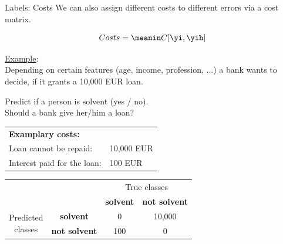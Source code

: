 \documentclass[11pt,compress,t,notes=noshow, xcolor=table]{beamer}
\begin{document}
\begin{vbframe}{Labels: Costs}
We can also assign different costs to different errors via a cost matrix.

$$
  Costs = \meanin C[\yi, \yih]
$$

\underline{Example}: \\

Depending on certain features (age, income, profession, ...) a bank wants to decide, if it grants a 10,000 EUR loan.\\ 

\medskip

Predict if a person is solvent (yes / no).\\ 
Should a bank give her/him a loan?\\


\medskip
  \begin{tabular}{ll}
    \textbf{Examplary costs:} & \\
    Loan cannot be repaid:& 10,000 EUR\\
    Interest paid for the loan:& 100 EUR\\
 
  \end{tabular}
  


 \begin{table}[ht]
 \small

\begin{tabular}{cccc}
    \hline
    & &\multicolumn{2}{c}{True classes} \\ 
    & &\textbf{solvent} & \textbf{not solvent}  \\ 
 \hline
    \multirow{2}{*}{\parbox{1cm}{Predicted \\ classes}}& \textbf{solvent}     & 0                 & 10,000\\
    & \textbf{not solvent} & 100               & 0\\
    \hline
\end{tabular}

\end{table}
 


\end{vbframe}
\end{document}
